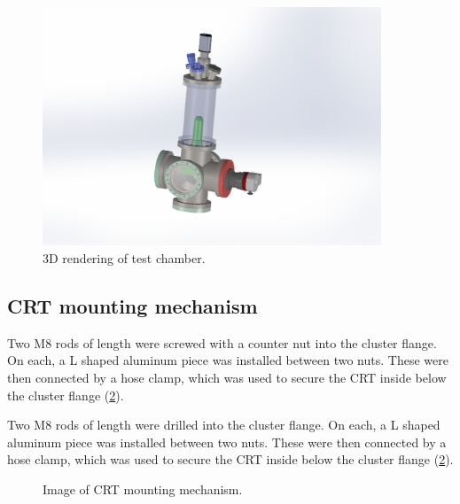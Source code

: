 \begin{figure}[ht]
	\centering
 	
	\includegraphics[width=0.9\textwidth]{./Chapters/vacuum-chamber/test_chamber} %
	
	\caption{3D rendering of test chamber.}
	\label{fig:3D rendering of test chamber}
\end{figure}
 
\subsection{CRT mounting mechanism}
\label{subsec:CRT mounting mechanism}

 Two M8 rods of length  were screwed with a counter nut into the cluster flange. On each, a L shaped aluminum piece was installed between two nuts. These were then connected by a hose clamp, which was used to secure the CRT inside below the cluster flange (\cref{fig:Image of CRT mounting mechanism}).
 
 Two M8 rods of length  were drilled  into the cluster flange. On each, a L shaped aluminum piece was installed between two nuts. These were then connected by a hose clamp, which was used to secure the CRT inside below the cluster flange (\cref{fig:Image of CRT mounting mechanism}).
 

\begin{figure}[h]
	\centering
	
	
	\caption{Image of CRT mounting mechanism.}
	\label{fig:Image of CRT mounting mechanism}
\end{figure}


